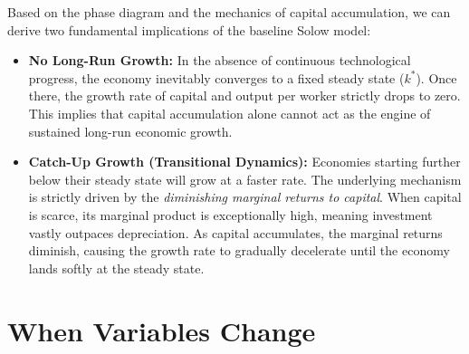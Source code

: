 \begin{center}
\end{center}

Based on the phase diagram and the mechanics of capital accumulation, we can derive two fundamental implications of the baseline Solow model:

\begin{itemize}
    \item \textbf{No Long-Run Growth:} In the absence of continuous technological progress, the economy inevitably converges to a fixed steady state ($k^*$). Once there, the growth rate of capital and output per worker strictly drops to zero. This implies that capital accumulation alone cannot act as the engine of sustained long-run economic growth.
    \item \textbf{Catch-Up Growth (Transitional Dynamics):} Economies starting further below their steady state will grow at a faster rate. The underlying mechanism is strictly driven by the \textit{diminishing marginal returns to capital}. When capital is scarce, its marginal product is exceptionally high, meaning investment vastly outpaces depreciation. As capital accumulates, the marginal returns diminish, causing the growth rate to gradually decelerate until the economy lands softly at the steady state.
\end{itemize}

\section{When Variables Change}

